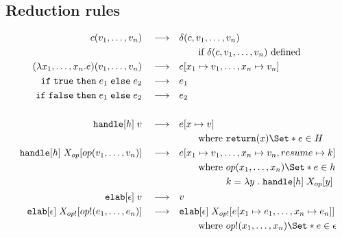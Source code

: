 \subsection{Reduction rules}
\newcommand{\reduce}{\quad\longrightarrow\quad}
\begin{align*}
    c(v_1, \dots, v_n) \reduce& \delta(c, v_1, \dots, v_n) \\
    &\qquad\text{if } \delta(c, v_1, \dots, v_n) \text{ defined}\\
    (\lambda x_1, \dots, x_n . e) (v_1, \dots, v_n) \reduce& e[x_1 \mapsto v_1, \dots, x_n \mapsto v_n] \\
    \cond{\true}{e_1}{e_2} \reduce& e_1 \\
    \cond{\false}{e_1}{e_2} \reduce& e_2 \\
    \\
    \kw{handle}[h]\;v \reduce& e[x\mapsto v] \\
    &\qquad\text{where } \return(x) \S{ e } \in H\\
    \kw{handle}[h]\;X_{op}[op(v_1, \dots, v_n)] \reduce& e[x_1\mapsto v_1, \dots, x_n\mapsto v_n, resume \mapsto k] \\
    &\qquad \text{where } \begin{aligned}[t]
        & op(x_1, \dots, x_n) \S{e} \in h\\
        & k = \lam{y}{\kw{handle}[h]\;
        X_{op}[y]}
    \end{aligned}\\
    \kw{elab}[\epsilon]\;v \reduce& v\\
    \kw{elab}[\epsilon]\;X_{op!}[op!(e_1, \dots, e_n)] \reduce& \kw{elab}[\epsilon]\;X_{op!}[e[x_1 \mapsto e_1, \dots, x_n \mapsto e_n]] \\
    &\qquad \text{where } op!(x_1, \dots, x_n) \S{e} \in \epsilon \\
\end{align*}
